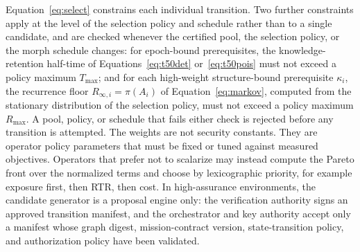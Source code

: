 \documentclass[11pt,letterpaper]{article}
\begin{document}
Equation~\eqref{eq:select} constrains each individual transition. Two further constraints apply at the level of the selection policy and schedule rather than to a single candidate, and are checked whenever the certified pool, the selection policy, or the morph schedule changes: for epoch-bound prerequisites, the knowledge-retention half-time of Equations~\eqref{eq:t50det} or~\eqref{eq:t50pois} must not exceed a policy maximum $T_{\max}$; and for each high-weight structure-bound prerequisite $\kappa_i$, the recurrence floor $R_{\infty,i}=\pi(A_i)$ of Equation~\eqref{eq:markov}, computed from the stationary distribution of the selection policy, must not exceed a policy maximum $R_{\max}$. A pool, policy, or schedule that fails either check is rejected before any transition is attempted. The weights are not security constants. They are operator policy parameters that must be fixed or tuned against measured objectives. Operators that prefer not to scalarize may instead compute the Pareto front over the normalized terms and choose by lexicographic priority, for example exposure first, then RTR, then cost. In high-assurance environments, the candidate generator is a proposal engine only: the verification authority signs an approved transition manifest, and the orchestrator and key authority accept only a manifest whose graph digest, mission-contract version, state-transition policy, and authorization policy have been validated.
\end{document}
